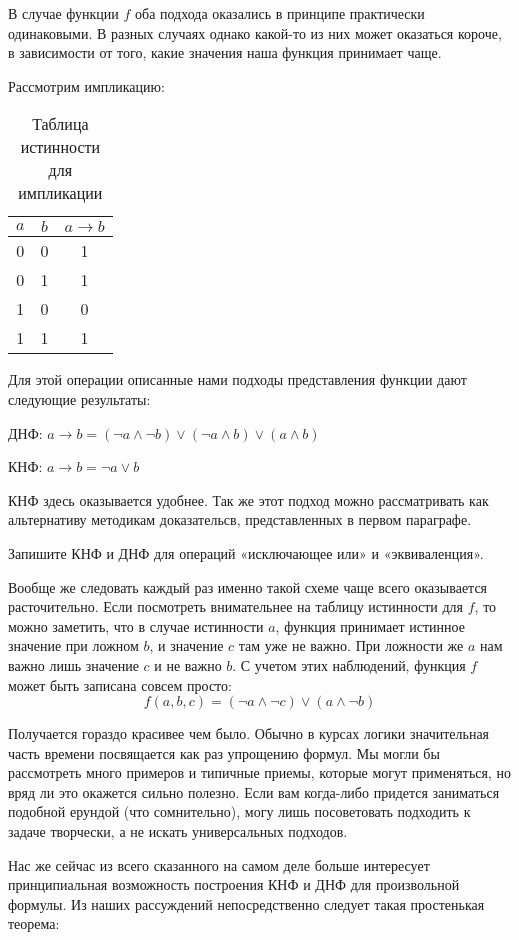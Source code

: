 В случае функции $f$ оба подхода оказались в принципе практически одинаковыми. В разных случаях однако какой-то из них может оказаться короче, в зависимости от того, какие значения наша функция принимает чаще.

Рассмотрим импликацию:

\begin{table}[h]
\centering
\begin{tabular}{cc|c}
$a$&$b$&$a\rightarrow b$\\
\hline
0&0&1 \\
0&1&1 \\
1&0&0 \\
1&1&1
\end{tabular}
\caption{Таблица истинности для импликации}
\end{table}

Для этой операции описанные нами подходы представления функции дают следующие результаты:

ДНФ: $a \rightarrow b = (\neg a\wedge \neg b)\vee(\neg a \wedge b)\vee(a\wedge b)$

КНФ: $a\rightarrow b = \neg a \vee b$

КНФ здесь оказывается удобнее. Так же этот подход можно рассматривать как альтернативу методикам доказательсв, представленных в первом параграфе.

\begin{exercise} Запишите КНФ и ДНФ для операций «исключающее или» и «эквиваленция».\end{exercise}

Вообще же следовать каждый раз именно такой схеме чаще всего оказывается расточительно. Если посмотреть внимательнее на таблицу истинности для $f$, то можно заметить, что в случае истинности $a$, функция принимает истинное значение при ложном $b$, и значение $c$ там уже не важно. При ложности же $a$ нам важно лишь значение $c$ и не важно $b$. С учетом этих наблюдений, функция $f$ может быть записана совсем просто: $$f(a, b, c) = (\neg a\wedge \neg c) \vee (a \wedge \neg b)$$

Получается гораздо красивее чем было. Обычно в курсах логики значительная часть времени посвящается как раз упрощению формул. Мы могли бы рассмотреть много примеров и типичные приемы, которые могут применяться, но вряд ли это окажется сильно полезно. Если вам когда-либо придется заниматься подобной ерундой (что сомнительно), могу лишь посоветовать подходить к задаче творчески, а не искать универсальных подходов.

Нас же сейчас из всего сказанного на самом деле больше интересует принципиальная возможность построения КНФ и ДНФ для произвольной формулы. Из наших рассуждений непосредственно следует такая простенькая теорема:

